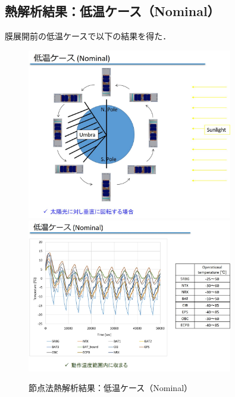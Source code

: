 \subsection{熱解析結果：低温ケース（Nominal）}
膜展開前の低温ケースで以下の結果を得た．
\begin{figure}[H]
	\centering
	\includegraphics[width=0.8\textwidth]{03/fig/3-7-6.jpg}
	\includegraphics[width=0.8\textwidth]{03/fig/3-7-7.jpg}
	\caption{節点法熱解析結果：低温ケース（Nominal）}
	\label{fig3-7-6}
\end{figure}


